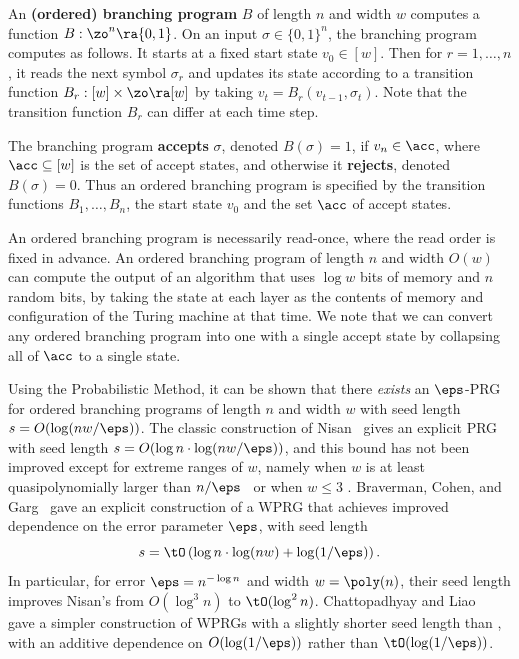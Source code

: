 \documentclass{toc}
\begin{document}
	\begin{definition} \label{def:obp}
	An \textbf{(ordered) branching program} $B$ of length $n$ and width $w$ computes a function $B:\zo^n \ra \{0,1\}$. On an input $\sigma\in\{0,1\}^n$, the branching program computes as follows. It starts at a fixed start state $v_0\in [w]$. Then for $r=1,\ldots,n$, it reads the next symbol $\sigma_r$ and updates its state according to a transition function $B_r:[w]\times \zo\ra[w]$ by taking $v_{t}=B_r(v_{t-1},\sigma_t)$. Note that the transition function $B_r$ can differ at each time step. 
	
	The branching program \textbf{accepts} $\sigma$, denoted $B(\sigma)=1$, if $v_{n}\in \acc$, where $\acc \subseteq [w]$ is the set of accept states, and otherwise it \textbf{rejects}, denoted $B(\sigma)=0$.
	Thus an ordered branching program is specified by the transition functions $B_1,\ldots,B_n$, the start state $v_0$ and the set $\acc$ of accept states.
	\end{definition}
	An ordered branching program is necessarily read-once, where the read order is fixed in advance.
	An ordered branching program of length $n$ and width $O(w)$ can compute the output of an algorithm that uses $\log w$ bits of memory and $n$ random bits, by taking the state at each layer as the contents of memory and configuration of the Turing machine at that time.  We note that we can convert any ordered branching program into one with a single accept state by collapsing all of $\acc$ to a single state.
	
	Using the Probabilistic Method, it can be shown that there \emph{exists} an $\eps$-PRG for ordered branching programs of length $n$ and width $w$ with seed length
	$s=O(\log(nw/\eps))$.  The classic construction of Nisan~\cite{Nisan92} gives an explicit
	PRG with seed length $s = O(\log n \cdot \log(nw/\eps))$, and this bound has not been improved except for extreme ranges of $w$, namely when
	$w$ is at least quasipolynomially larger than $n/\eps$~\cite{NisanZu96,Armoni98,KaneNeWo08} or when $w\leq 3$ \cite{BogdanovDvVeYe09,SimaZa11,GopalanMeReTrVa12,MekaReTa18}.
	Braverman, Cohen, and Garg~\cite{BravermanCoGa18} gave an explicit construction of a WPRG that achieves improved dependence on the error parameter $\eps$, with seed length  $$s=\tO\left(\log n\cdot \log(nw) + \log(1/\eps)\right).$$
	In particular, for error $\eps=n^{-\log n}$ and width $w=\poly(n)$, their seed length improves Nisan's from $O(\log^3 n)$ to $\tO(\log^2 n)$.  
	Chattopadhyay %
    and Liao~\cite{ChattopadhyayLi20} gave a simpler construction of WPRGs with a slightly shorter seed length than \cite{BravermanCoGa18}, with an additive dependence on $O(\log(1/\eps))$ rather than $\tO(\log(1/\eps))$.
\end{document}
